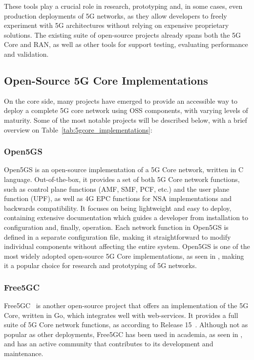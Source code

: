 These tools play a crucial role in research, prototyping and, in some cases, even production deployments of 5G networks, as they allow developers to freely experiment with 5G architectures without relying on expensive proprietary solutions. The existing suite of open-source projects already spans both the 5G Core and \gls{RAN}, as well as other tools for support testing, evaluating performance and validation.

\subsection{Open-Source 5G Core Implementations}
\label{sec:open_source_5g_core_implementations}
On the core side, many projects have emerged to provide an accessible way to deploy a complete 5G core network using \gls{OSS} components, with varying levels of maturity. Some of the most notable projects will be described below, with a brief overview on Table~\ref{tab:5gcore_implementations}:

\subsubsection{Open5GS}
Open5GS \cite{open5gs_repo} is an open-source implementation of a 5G Core network, written in C language. Out-of-the-box, it provides a set of both 5G Core network functions, such as control plane functions (\gls{AMF}, \gls{SMF}, \gls{PCF}, etc.) and the user plane function (\gls{UPF}), as well as 4G \gls{EPC} functions for \gls{NSA} implementations and backwards compatibility. It focuses on being lightweight and easy to deploy, containing extensive documentation which guides a developer from installation to configuration and, finally, operation. Each network function in Open5GS is defined in a separate configuration file, making it straightforward to modify individual components without affecting the entire system.
Open5GS is one of the most widely adopted open-source 5G Core implementations, as seen in \cites{bonati2025_5gct}{horstmann2025open5gcube}{mamushiane2023deploying}{tio2025exploring5g}, making it a popular choice for research and prototyping of 5G networks.

\subsubsection{Free5GC}
\label{sec:free5gc}

Free5GC~\cite{free5gc_repo} is another open-source project that offers an implementation of the 5G Core, written in Go, which integrates well with web-services. It provides a full suite of 5G Core network functions, as according to  Release 15~\cite{3GPPRelease15}. Although not as popular as other deployments, Free5GC has been used in academia, as seen in \cite{horstmann2025open5gcube}, and has an active community that contributes to its development and maintenance.

